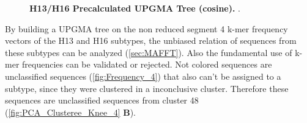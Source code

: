 \begin{figure}[!hbt]
    \caption[H13/H16 Precalculated \Acrshort{UPGMA} Tree (cosine)]{\textbf{H13/H16 Precalculated \Acrshort{UPGMA} Tree (cosine).} .}
    \label{fig:Precalculated_Cosine}
\end{figure}

By building a \gls{UPGMA} tree on the non reduced segment 4 k-mer frequency vectors of the H13 and H16 subtypes, the unbiased relation of sequences from these subtypes can be analyzed (\autoref{sec:MAFFT}). Also the fundamental use of k-mer frequencies can be validated or rejected. Not colored sequences are unclassified sequences (\autoref{fig:Frequency_4}) that also can't be assigned to a subtype, since they were clustered in a inconclusive cluster. Therefore these sequences are unclassified sequences from cluster 48 (\autoref{fig:PCA_Clusteree_Knee_4} \textbf{\textsf{B}}).

